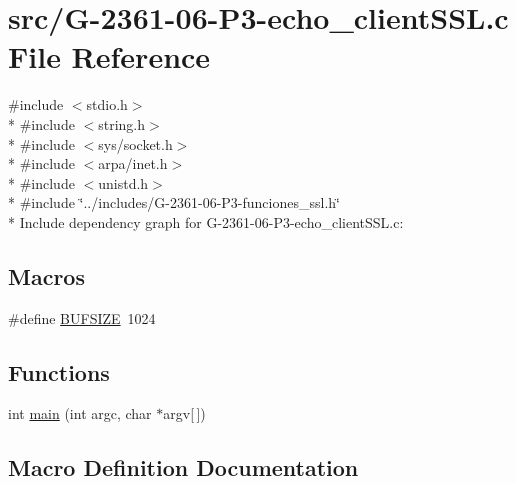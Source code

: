 \hypertarget{_g-2361-06-_p3-echo__client_s_s_l_8c}{}\section{src/\+G-\/2361-\/06-\/\+P3-\/echo\+\_\+client\+S\+SL.c File Reference}
\label{_g-2361-06-_p3-echo__client_s_s_l_8c}
{\ttfamily \#include $<$stdio.\+h$>$}\\*
{\ttfamily \#include $<$string.\+h$>$}\\*
{\ttfamily \#include $<$sys/socket.\+h$>$}\\*
{\ttfamily \#include $<$arpa/inet.\+h$>$}\\*
{\ttfamily \#include $<$unistd.\+h$>$}\\*
{\ttfamily \#include \char`\"{}../includes/\+G-\/2361-\/06-\/\+P3-\/funciones\+\_\+ssl.\+h\char`\"{}}\\*
Include dependency graph for G-\/2361-\/06-\/\+P3-\/echo\+\_\+client\+S\+SL.c\+:
\subsection*{Macros}
\begin{DoxyCompactItemize}
\item 
\#define \hyperlink{_g-2361-06-_p3-echo__client_s_s_l_8c_aeca034f67218340ecb2261a22c2f3dcd}{B\+U\+F\+S\+I\+ZE}~1024
\end{DoxyCompactItemize}
\subsection*{Functions}
\begin{DoxyCompactItemize}
\item 
int \hyperlink{_g-2361-06-_p3-echo__client_s_s_l_8c_a0ddf1224851353fc92bfbff6f499fa97}{main} (int argc, char $\ast$argv\mbox{[}$\,$\mbox{]})
\end{DoxyCompactItemize}


\subsection{Macro Definition Documentation}
